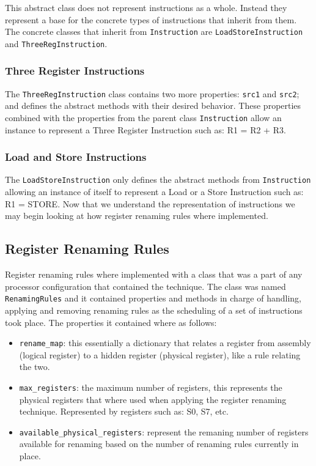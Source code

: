 \documentclass{article}
\begin{document}
This abstract class does not represent instructions as a whole. Instead they represent a base for the concrete types of instructions that inherit from them. The concrete classes that inherit from \lstinline|Instruction| are \lstinline|LoadStoreInstruction| and \lstinline|ThreeRegInstruction|.
\subsubsection{Three Register Instructions}
The \lstinline|ThreeRegInstruction| class contains two more properties: \lstinline|src1| and \lstinline|src2|; and defines the abstract methods with their desired behavior. These properties combined with the properties from the parent class \lstinline|Instruction| allow an instance to represent a Three Register Instruction such as: R1 = R2 + R3.

\subsubsection{Load and Store Instructions}
The \lstinline|LoadStoreInstruction| only defines the abstract methods from \lstinline|Instruction| allowing an instance of itself to represent a Load or a Store Instruction such as: R1 = STORE. Now that we understand the representation of instructions we may begin looking at how register renaming rules where implemented. 

\subsection{Register Renaming Rules}
Register renaming rules where implemented with a class that was a part of any processor configuration that contained the technique. The class was named \lstinline|RenamingRules| and it contained properties and methods in charge of handling, applying and removing renaming rules as the scheduling of a set of instructions took place. The properties it contained where as follows:

\begin{itemize}
    \item \lstinline|rename_map|: this essentially a dictionary that relates a register from assembly (logical register) to a hidden register (physical register), like a rule relating the two. 
    \item \lstinline|max_registers|: the maximum number of registers, this represents the physical registers that where used when applying the register renaming technique. Represented by registers such as: S0, S7, etc.
    \item \lstinline|available_physical_registers|: represent the remaning number of registers available for renaming based on the number of renaming rules currently in place. 
\end{itemize}
\end{document}
